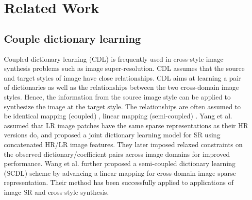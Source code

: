 \documentclass[10pt,twocolumn,letterpaper]{article}
\begin{document}
\section{Related Work}

\subsection{Couple dictionary learning}
Coupled dictionary learning (CDL) is frequently used in cross-style image synthesis problems such as image super-resolution. CDL assumes that the source and target styles of image have close relationships. CDL aims at learning a pair of dictionaries as well as the relationships between the two cross-domain image styles. Hence, the information from the source image style can be applied to synthesize the image at the target style. The relationships are often assumed to be identical mapping (coupled) \cite{yang2010image}, linear mapping (semi-coupled) \cite{wang2012semi}. Yang et al. \cite{yang2010image} assumed that LR image patches have the same sparse representations as their HR versions do, and proposed a joint dictionary learning model for SR using concatenated HR/LR image features. They later imposed relaxed constraints on the observed dictionary/coefficient pairs across image domains for improved performance. Wang et al. \cite{wang2012semi} further proposed a semi-coupled dictionary
learning (SCDL) scheme by advancing a linear mapping for cross-domain image sparse representation. Their method
has been successfully applied to applications of image SR and cross-style synthesis.
\end{document}
